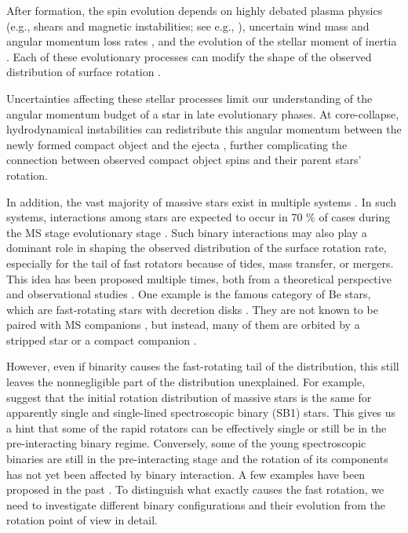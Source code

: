 \documentclass{aa}
\begin{document}
After formation, the spin evolution depends on highly debated plasma physics (e.g., shears and magnetic
instabilities; see e.g., \citealt{Tayler_1973, spruit:99, spruit:02,Maeder_2000, fuller:19, denhartogh:20,ji:23}), uncertain wind mass
and angular momentum loss rates \citep[e.g.,][]{smith:14, renzo:17},
and the evolution of the stellar moment of inertia \citep[e.g.,][]{langer:98,zhao:20}.
Each of these evolutionary processes can modify the shape of the observed distribution of surface rotation \citep{Maeder_2000}.

Uncertainties affecting these stellar processes limit our
understanding of the angular momentum budget of a star in late evolutionary phases.
At core-collapse, hydrodynamical instabilities can redistribute this angular momentum between the newly formed compact object and the ejecta \citep[e.g.,][]{Kazeroni_2017}, further complicating the
connection between observed compact object spins and their parent stars' rotation.


In addition, the vast majority of massive stars exist in multiple systems \citep[e.g.,][]{Mason_2009, Duchene_2013, Sana_2013, Kobulnicky_2014, Dunstall_2015, Almeida_2017, Offner_2022}.
In such systems, interactions among stars are expected to occur in 70 \% of cases during the MS stage evolutionary stage \citep{Sana_2012}.
Such binary interactions may also play a dominant role in shaping the observed
distribution of the surface rotation rate, especially for the tail of fast rotators because of tides, mass transfer, or mergers. This idea has been proposed
  multiple times, both from a theoretical perspective
  \citep{packet:81, Pols_1994, deMink_2013, vinciguerra:20} and observational studies \citep{blaauw:93,  vfts_2015_otype, Cazorla2017b, Britavskiy_2023}.
One example is the famous category of Be stars, which are fast-rotating stars with decretion disks \citep{Fremat_2005, Rivinius_2013}.
They are not known to be paired with MS companions \citep{Bodensteiner_2020}, but instead, many of them are orbited by a stripped star \citep{Wang_2018,Wang_2021} or a compact companion \citep[e.g.,][]{Reig_2011,Dodd_2023}.


However, even if binarity causes the fast-rotating tail of the distribution, this still leaves the nonnegligible part of the distribution unexplained. For example, \citet{vfts_2015_otype} suggest that
the initial rotation distribution of massive stars is the same for
apparently single and single-lined spectroscopic binary (SB1) stars.
This gives us a hint that some of the rapid rotators can be effectively single or still be in the pre-interacting binary regime.
Conversely, some of the young spectroscopic binaries are still in the pre-interacting stage and the rotation of its components has not yet been affected by binary interaction. A few examples have been proposed in the past \citep{Johnston2021,Stassun_2021, Naze_2023_rot}.
To distinguish what exactly causes the fast rotation, we need to investigate different binary configurations and their evolution from the rotation point of view 
in detail.
\end{document}
